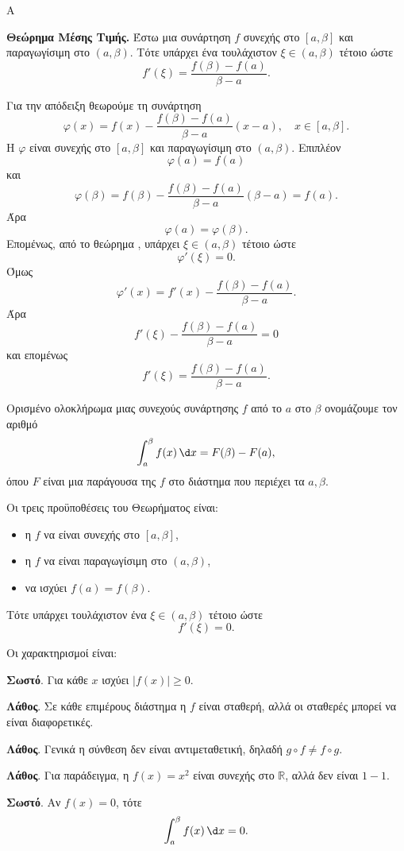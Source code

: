 \begin{thema}{Α}
\begin{erwthma}
\item \textbf{Θεώρημα Μέσης Τιμής.} Έστω μια συνάρτηση $f$ συνεχής στο $[a,\beta]$ και παραγωγίσιμη στο $(a,\beta)$. Τότε υπάρχει ένα τουλάχιστον $\xi\in(a,\beta)$ τέτοιο ώστε
\[
f'(\xi)=\frac{f(\beta)-f(a)}{\beta-a}.
\]

Για την απόδειξη θεωρούμε τη συνάρτηση
\[
\varphi(x)=f(x)-\frac{f(\beta)-f(a)}{\beta-a}(x-a),\quad x\in[a,\beta].
\]
Η $\varphi$ είναι συνεχής στο $[a,\beta]$ και παραγωγίσιμη στο $(a,\beta)$. Επιπλέον
\[
\varphi(a)=f(a)
\]
και
\[
\varphi(\beta)=f(\beta)-\frac{f(\beta)-f(a)}{\beta-a}(\beta-a)=f(a).
\]
Άρα
\[
\varphi(a)=\varphi(\beta).
\]
Επομένως, από το θεώρημα , υπάρχει $\xi\in(a,\beta)$ τέτοιο ώστε
\[
\varphi'(\xi)=0.
\]
Όμως
\[
\varphi'(x)=f'(x)-\frac{f(\beta)-f(a)}{\beta-a}.
\]
Άρα
\[
f'(\xi)-\frac{f(\beta)-f(a)}{\beta-a}=0
\]
και επομένως
\[
{f'(\xi)=\frac{f(\beta)-f(a)}{\beta-a}}.
\]

\item Ορισμένο ολοκλήρωμα μιας συνεχούς συνάρτησης $f$ από το $a$ στο $\beta$ ονομάζουμε τον αριθμό
\[
\dint_a^\beta f(x)\,\d x=F(\beta)-F(a),
\]
όπου $F$ είναι μια παράγουσα της $f$ στο διάστημα που περιέχει τα $a,\beta$.

\item Οι τρεις προϋποθέσεις του Θεωρήματος  είναι:
\begin{itemize}
\item η $f$ να είναι συνεχής στο $[a,\beta]$,
\item η $f$ να είναι παραγωγίσιμη στο $(a,\beta)$,
\item να ισχύει $f(a)=f(\beta)$.
\end{itemize}
Τότε υπάρχει τουλάχιστον ένα $\xi\in(a,\beta)$ τέτοιο ώστε
\[
f'(\xi)=0.
\]

\item Οι χαρακτηρισμοί είναι:
\begin{alist}
\item \textbf{Σωστό}. Για κάθε $x$ ισχύει $|f(x)|\geq0$.
\item \textbf{Λάθος}. Σε κάθε επιμέρους διάστημα η $f$ είναι σταθερή, αλλά οι σταθερές μπορεί να είναι διαφορετικές.
\item \textbf{Λάθος}. Γενικά η σύνθεση δεν είναι αντιμεταθετική, δηλαδή $g\circ f\neq f\circ g$.
\item \textbf{Λάθος}. Για παράδειγμα, η $f(x)=x^2$ είναι συνεχής στο $\mathbb{R}$, αλλά δεν είναι $1-1$.
\item \textbf{Σωστό}. Αν $f(x)=0$, τότε
\[
\dint_a^\beta f(x)\,\d x=0.
\]
\end{alist}
\end{erwthma}
\end{thema}

